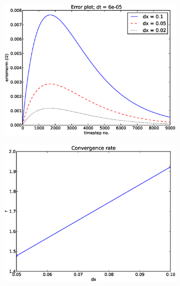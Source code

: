 \begin{figure}[H]
\centering
 \begin{subfigure}{0.49\textwidth}
  \includegraphics[width=\textwidth]{../results/experiment_22052014_1254_spatial_convergencetest_BE1D/results/errorplot.eps}
  \caption{}
 \end{subfigure}
 \begin{subfigure}{0.49\textwidth}
  \includegraphics[width=\textwidth]{../results/experiment_22052014_1254_spatial_convergencetest_BE1D/results/ConvergenceTest.eps}
  \caption{}
 \end{subfigure}
 

\end{figure}
